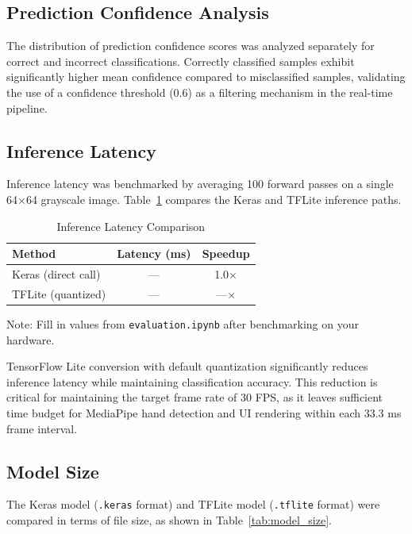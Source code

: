 \documentclass[conference]{IEEEtran}
\begin{document}
\subsection{Prediction Confidence Analysis}

The distribution of prediction confidence scores was analyzed separately for correct and incorrect classifications. Correctly classified samples exhibit significantly higher mean confidence compared to misclassified samples, validating the use of a confidence threshold (0.6) as a filtering mechanism in the real-time pipeline.

\subsection{Inference Latency}

Inference latency was benchmarked by averaging 100 forward passes on a single 64$\times$64 grayscale image. Table~\ref{tab:latency} compares the Keras and TFLite inference paths.

\begin{table}[htbp]
\caption{Inference Latency Comparison}
\label{tab:latency}
\centering
\begin{tabular}{lcc}
\toprule
\textbf{Method} & \textbf{Latency (ms)} & \textbf{Speedup} \\
\midrule
Keras (direct call) & --- & 1.0$\times$ \\
TFLite (quantized) & --- & ---$\times$ \\
\bottomrule
\end{tabular}
\begin{flushleft}
\footnotesize{Note: Fill in values from \texttt{evaluation.ipynb} after benchmarking on your hardware.}
\end{flushleft}
\end{table}

TensorFlow Lite conversion with default quantization significantly reduces inference latency while maintaining classification accuracy. This reduction is critical for maintaining the target frame rate of 30 FPS, as it leaves sufficient time budget for MediaPipe hand detection and UI rendering within each 33.3 ms frame interval.

\subsection{Model Size}

The Keras model (\texttt{.keras} format) and TFLite model (\texttt{.tflite} format) were compared in terms of file size, as shown in Table~\ref{tab:model_size}.
\end{document}
